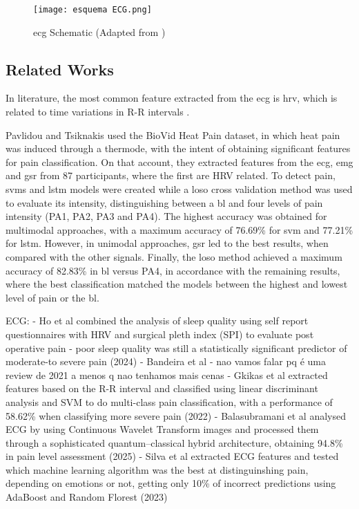 \begin{figure}[h!]
    \centering
    \texttt{[image: esquema ECG.png]}
    \caption{\ac{ecg} Schematic (Adapted from \cite{Dogan2023})}
    \label{fig:esquemaecg}
\end{figure}


\subsection{Related Works}


In literature, the most common feature extracted from the \ac{ecg} is \ac{hrv}, which is related to time variations in R-R intervals \cite{Moscato2022}\cite{Pais2025}. 

Pavlidou and Tsiknakis \cite{Pavlidou2025} used the BioVid Heat Pain dataset, in which heat pain was induced through a thermode, with the intent of obtaining significant features for pain classification. On that account, they extracted features from the \ac{ecg}, \ac{emg} and \ac{gsr} from 87 participants, where the first are HRV related. To detect pain, \acp{svm} and \ac{lstm} models were created while a \ac{loso} cross validation method was used to evaluate its intensity, distinguishing between a \ac{bl} and four levels of pain intensity (PA1, PA2, PA3 and PA4). The highest accuracy was obtained for multimodal approaches, with a maximum accuracy of 76.69\% for \ac{svm} and 77.21\% for \ac{lstm}. However, in unimodal approaches, \ac{gsr} led to the best results, when compared with the other signals. Finally, the \ac{loso} method achieved a maximum accuracy of 82.83\% in \ac{bl} versus PA4, in accordance with the remaining results, where the best classification matched the models between the highest and lowest level of pain or the \ac{bl}.



ECG:
- Ho et al combined the analysis of sleep quality using self report questionnaires with HRV and surgical pleth index (SPI) to evaluate post operative pain - poor sleep quality was still a statistically significant predictor of moderate-to severe pain (2024)
- Bandeira et al - nao vamos falar pq é uma review de 2021 a menos q nao tenhamos mais cenas
- Gkikas et al extracted features based on the R-R interval and classified using linear discriminant analysis and SVM to do multi-class pain classification, with a performance of 58.62\% when classifying more severe pain (2022)
- Balasubramani et al analysed ECG by using Continuous Wavelet Transform images and processed them through a sophisticated quantum–classical hybrid architecture, obtaining 94.8\% in pain level assessment (2025)
- Silva et al extracted ECG features and tested which machine learning algorithm was the best at distinguinshing pain, depending on emotions or not, getting only 10\% of incorrect predictions using AdaBoost and Random Florest (2023)


